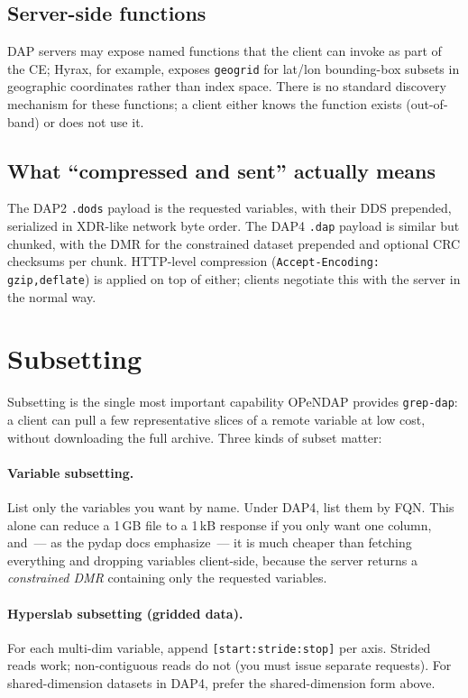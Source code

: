 \documentclass[11pt]{article}
\begin{document}
\subsection{Server-side functions}

DAP servers may expose named functions that the client can invoke as
part of the CE; Hyrax, for example, exposes \texttt{geogrid} for
lat/lon bounding-box subsets in geographic coordinates rather than
index space. There is no standard discovery mechanism for these
functions; a client either knows the function exists (out-of-band) or
does not use it.

\subsection{What ``compressed and sent'' actually means}

The DAP2 \texttt{.dods} payload is the requested variables, with their
DDS prepended, serialized in XDR-like network byte order. The DAP4
\texttt{.dap} payload is similar but chunked, with the DMR for the
constrained dataset prepended and optional CRC checksums per chunk.
HTTP-level compression (\texttt{Accept-Encoding: gzip,deflate}) is
applied on top of either; clients negotiate this with the server in
the normal way.

\section{Subsetting}

Subsetting is the single most important capability OPeNDAP provides
\texttt{grep-dap}: a client can pull a few representative slices of a
remote variable at low cost, without downloading the full archive.
Three kinds of subset matter:

\paragraph{Variable subsetting.} List only the variables you want by
name. Under DAP4, list them by FQN. This alone can reduce a 1\,GB
file to a 1\,kB response if you only want one column, and~--- as the
pydap docs emphasize~--- it is much cheaper than fetching everything
and dropping variables client-side, because the server returns a
\emph{constrained DMR} containing only the requested variables.

\paragraph{Hyperslab subsetting (gridded data).} For each multi-dim
variable, append \texttt{[start:stride:stop]} per axis. Strided reads
work; non-contiguous reads do not (you must issue separate requests).
For shared-dimension datasets in DAP4, prefer the shared-dimension
form above.
\end{document}
